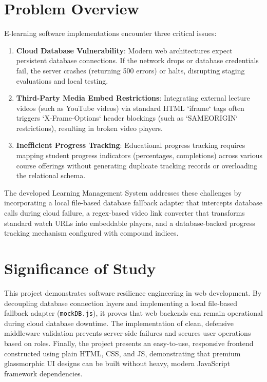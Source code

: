 \documentclass[12pt,a4paper]{report}
\begin{document}
\section{Problem Overview}
E-learning software implementations encounter three critical issues:
\begin{enumerate}
    \item \textbf{Cloud Database Vulnerability}: Modern web architectures expect persistent database connections. If the network drops or database credentials fail, the server crashes (returning 500 errors) or halts, disrupting staging evaluations and local testing.
    \item \textbf{Third-Party Media Embed Restrictions}: Integrating external lecture videos (such as YouTube videos) via standard HTML `iframe` tags often triggers `X-Frame-Options` header blockings (such as `SAMEORIGIN` restrictions), resulting in broken video players.
    \item \textbf{Inefficient Progress Tracking}: Educational progress tracking requires mapping student progress indicators (percentages, completions) across various course offerings without generating duplicate tracking records or overloading the relational schema.
\end{enumerate}

The developed Learning Management System addresses these challenges by incorporating a local file-based database fallback adapter that intercepts database calls during cloud failure, a regex-based video link converter that transforms standard watch URLs into embeddable players, and a database-backed progress tracking mechanism configured with compound indices.

\section{Significance of Study}
This project demonstrates software resilience engineering in web development. By decoupling database connection layers and implementing a local file-based fallback adapter (\texttt{mockDB.js}), it proves that web backends can remain operational during cloud database downtime. The implementation of clean, defensive middleware validation prevents server-side failures and secures user operations based on roles. Finally, the project presents an easy-to-use, responsive frontend constructed using plain HTML, CSS, and JS, demonstrating that premium glassmorphic UI designs can be built without heavy, modern JavaScript framework dependencies.
\end{document}
